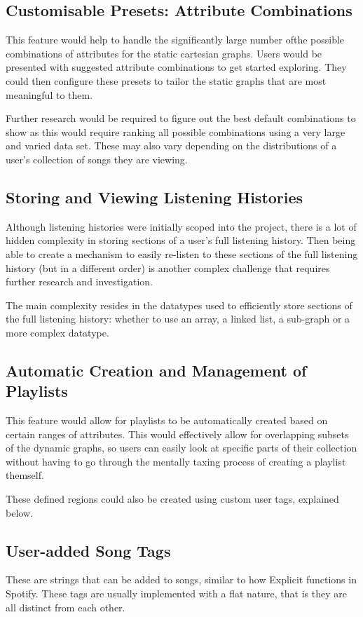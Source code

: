 \subsection{Customisable Presets: Attribute Combinations}
This feature would help to handle the significantly large number ofthe possible combinations of attributes for the static cartesian graphs. Users would be presented with suggested attribute combinations to get started exploring. They could then configure these presets to tailor the static graphs that are most meaningful to them.

Further research would be required to figure out the best default combinations to show as this would require ranking all possible combinations using a very large and varied data set. These may also vary depending on the distributions of a user's collection of songs they are viewing.

\subsection{Storing and Viewing Listening Histories}
Although listening histories were initially scoped into the project, there is a lot of hidden complexity in storing sections of a user's full listening history. Then being able to create a mechanism to easily re-listen to these sections of the full listening history (but in a different order) is another complex challenge that requires further research and investigation.

The main complexity resides in the datatypes used to efficiently store sections of the full listening history: whether to use an array, a linked list, a sub-graph or a more complex datatype.

\subsection{Automatic Creation and Management of Playlists}
This feature would allow for playlists to be automatically created based on certain ranges of attributes. This would effectively allow for overlapping subsets of the dynamic graphs, so users can easily look at specific parts of their collection without having to go through the mentally taxing process of creating a playlist themself.

These defined regions could also be created using custom user tags, explained below.

\subsection{User-added Song Tags}
These are strings that can be added to songs, similar to how Explicit functions in Spotify. These tags are usually implemented with a flat nature, that is they are all distinct from each other.

